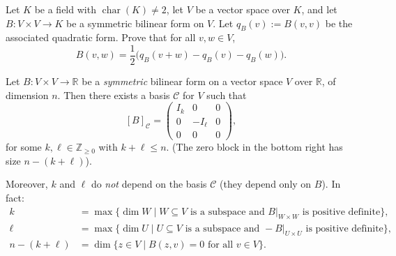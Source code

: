 \begin{exercise}
  \label{exc:polarization_quadratic_forms_series26}
  Let $K$ be a field with $\operatorname{char}(K) \neq 2$, let $V$ be a vector space over $K$, and let $B \colon V \times V \to K$ be a symmetric bilinear form on $V$. Let $q_B(v) := B(v, v)$ be the associated quadratic form. Prove that for all $v, w \in V$,
  \[
  B(v, w) = \frac{1}{2} \big( q_B(v + w) - q_B(v) - q_B(w) \big).
  \]
\end{exercise}

\begin{theorem}
\label{thm:sylvesters_inertia}
Let $B \colon V \times V \to \mathbb{R}$ be a \emph{symmetric} bilinear form on a vector space $V$ over $\mathbb{R}$, of dimension $n$. Then there exists a basis $\mathcal{C}$ for $V$ such that
\[
[B]_{\mathcal{C}} = \left( \begin{array}{c|c|c}
  I_k & 0 & 0 \\ \hline
  0 & -I_\ell & 0 \\ \hline
  0 & 0 & 0
\end{array} \right),
\]
for some $k, \ell \in \mathbb{Z}_{\ge 0}$ with $k + \ell \le n$. (The zero block in the bottom right has size $n - (k + \ell)$).

Moreover, $k$ and $\ell$ do \emph{not} depend on the basis $\mathcal{C}$ (they depend only on $B$). In fact:
\begin{align*}
k &= \max \{ \dim W \mid W \subseteq V \text{ is a subspace and } B|_{W \times W} \text{ is positive definite} \}, \\
\ell &= \max \{ \dim U \mid U \subseteq V \text{ is a subspace and } -B|_{U \times U} \text{ is positive definite} \}, \\
n - (k + \ell) &= \dim \{ z \in V \mid B(z, v) = 0 \text{ for all } v \in V \}.
\end{align*}
\end{theorem}

